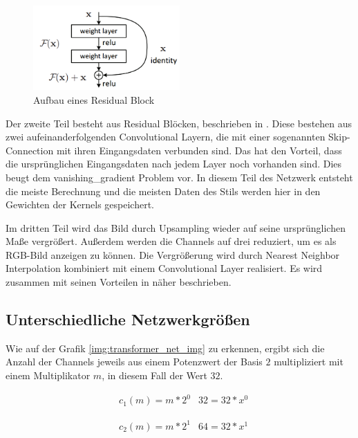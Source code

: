 \begin{figure}[H]
	\centering
	\includegraphics[width=0.50\textwidth]{resources/content/residual_block.png}
	\caption{Aufbau eines Residual Block \cite{residual_block_img}}
	\label{img:residual_block_img}
\end{figure}

Der zweite Teil besteht aus Residual Blöcken, beschrieben in \cite{DBLP:journals/corr/HeZRS15}. Diese bestehen aus zwei aufeinanderfolgenden Convolutional Layern, die mit einer sogenannten Skip-Connection mit ihren Eingangsdaten verbunden sind. Das hat den Vorteil, dass die ursprünglichen Eingangsdaten nach jedem Layer noch vorhanden sind. Dies beugt dem \gls{vanishing_gradient} Problem vor. In diesem Teil des Netzwerk entsteht die meiste Berechnung und die meisten Daten des Stils werden hier in den Gewichten der Kernels gespeichert.

Im dritten Teil wird das Bild durch Upsampling wieder auf seine ursprünglichen Maße vergrößert. Außerdem werden die Channels auf drei reduziert, um es als RGB-Bild anzeigen zu können. Die Vergrößerung wird durch Nearest Neighbor Interpolation kombiniert mit einem Convolutional Layer realisiert. Es wird zusammen mit seinen Vorteilen in \cite{odena2016deconvolution} näher beschrieben.

\pagebreak

\subsection{Unterschiedliche Netzwerkgrößen}

Wie auf der Grafik \ref{img:transformer_net_img} zu erkennen, ergibt sich die Anzahl der Channels jeweils aus einem Potenzwert der Basis $ 2 $ multipliziert mit einem Multiplikator $ m $, in diesem Fall der Wert $ 32 $.

\begin{align}
	& c_{1}(m) = m * 2^{0}
	& 32 = 32 * x^{0}
\end{align}

\begin{align}
	& c_{2}(m) = m * 2^{1}
	& 64 = 32 * x^{1}
\end{align}

